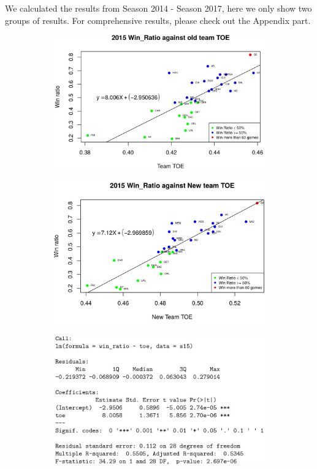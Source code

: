 \documentclass[11pt]{article}
\begin{document}
We calculated the results from Season 2014 - Season 2017, here we only show two groups of results. For comprehensive results, please check out the Appendix part.
\begin{figure}[h!]
  \centering
  \begin{subfigure}[b]{0.45\linewidth}
    \includegraphics[width=\linewidth]{15old.jpg}
  \end{subfigure}
  \begin{subfigure}[b]{0.45\linewidth}
    \includegraphics[width=\linewidth]{15new.jpg}
  \end{subfigure}
  \begin{subfigure}[b]{0.42\linewidth}
    \includegraphics[width=\linewidth]{15oldSummary.jpg}

\end{subfigure}
\end{figure}
\end{document}

